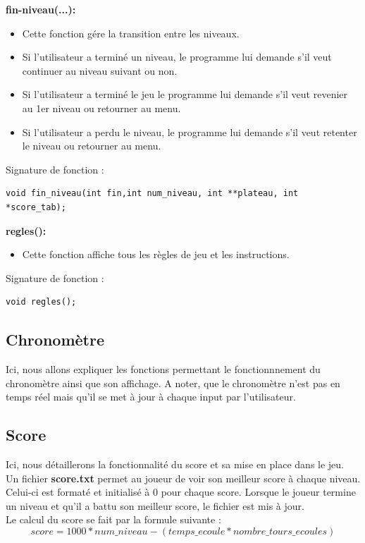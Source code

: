 \documentclass{article}
\begin{document}
\textbf{fin-niveau(...):}
\begin{itemize}
\item Cette fonction gére la transition entre les niveaux.
\item Si l'utilisateur a terminé un niveau, le programme lui demande s'il veut continuer au niveau suivant ou non.
\item Si l'utilisateur a terminé le jeu le programme lui demande s'il veut revenier au 1er niveau ou retourner au menu.
\item Si l'utilisateur a perdu le niveau, le programme lui demande s'il veut retenter le niveau ou retourner au menu.
\end{itemize}
Signature de fonction :
\begin{lstlisting}
void fin_niveau(int fin,int num_niveau, int **plateau, int *score_tab);
\end{lstlisting}
\textbf{regles():}
\begin{itemize}
\item Cette fonction affiche tous les règles de jeu et les instructions.
\end{itemize}
Signature de fonction :
\begin{lstlisting}
void regles();
\end{lstlisting}
\newpage

\subsection{Chronomètre}
Ici, nous allons expliquer les fonctions permettant le fonctionnnement du chronomètre ainsi que son affichage.
A noter, que le chronomètre n'est pas en temps réel mais qu'il se met à jour à chaque input par l'utilisateur.
\newpage

\subsection{Score}
Ici, nous détaillerons la fonctionnalité du score et sa mise en place dans le jeu.\\ 
Un fichier \textbf{score.txt} permet au joueur de voir son meilleur score à chaque niveau. Celui-ci est formaté et initialisé à 0 pour chaque score. Lorsque le joueur termine un niveau et qu'il a battu son meilleur score, le fichier est mis à jour.\\
Le calcul du score se fait par la formule suivante :
\begin{equation}
    score = 1000*num\_niveau - (temps\_ecoule*nombre\_tours\_ecoules)
\end{equation}




\listoffigures
\end{document}
